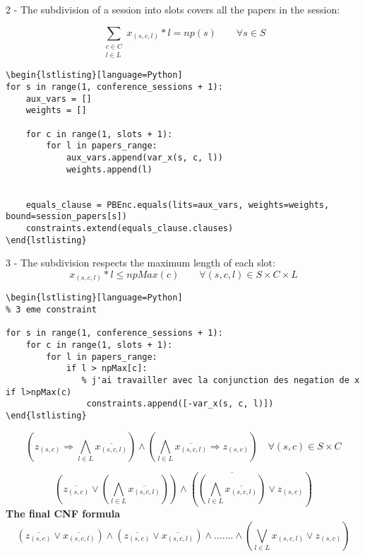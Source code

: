 \documentclass{article}
\begin{document}
2 - The subdivision of a session into slots covers all the papers in the session:

$$ \sum_{\substack{c\in C\\ l\in L}} x_{(s,c,l)}*l  = np(s)   \qquad \forall s\in S$$

\begin{verbatim}
\begin{lstlisting}[language=Python]
for s in range(1, conference_sessions + 1):
    aux_vars = []  
    weights = []   

    for c in range(1, slots + 1):
        for l in papers_range:
            aux_vars.append(var_x(s, c, l))
            weights.append(l)  

   
    equals_clause = PBEnc.equals(lits=aux_vars, weights=weights, bound=session_papers[s])
    constraints.extend(equals_clause.clauses)
\end{lstlisting}
\end{verbatim}

3 - The subdivision respects the maximum length of each slot:
$$ x_{(s,c,l)}*l \leq npMax(c)\qquad \forall (s,c,l)\in S\times C\times L $$

\begin{verbatim}
\begin{lstlisting}[language=Python]
% 3 eme constraint

for s in range(1, conference_sessions + 1):
    for c in range(1, slots + 1):
        for l in papers_range:
            if l > npMax[c]:
               % j'ai travailler avec la conjunction des negation de x if l>npMax(c)
                constraints.append([-var_x(s, c, l)])
\end{lstlisting}
\end{verbatim}

$$ \left( z_{(s,c)} \Longrightarrow \bigwedge_{l\in L} \overline{x_{(s,c,l)}} \right) \wedge \left( \bigwedge_{l\in L} \overline{x_{(s,c,l)}} \Longrightarrow z_{(s,c)} \right) \quad \forall (s,c)\in S\times C $$

$$\left(\overline{z_{(s,c)}} \vee \left(\bigwedge_{l\in L} \overline{x_{(s,c,l)}}\right) \right)\wedge \left( \overline{\left(\bigwedge_{l\in L} \overline{x_{(s,c,l)}}\right)} \vee z_{(s,c)} \right)  $$
\textbf{The final CNF formula}\\
$$\left(\overline{z_{(s,c)}} \vee \overline{x_{(s,c,l)}}\right)
 \wedge \left(\overline{z_{(s,c)}} \vee \overline{x_{(s,c,l)}}\right)\wedge ....... \wedge \left(\bigvee_{l\in L} x_{(s,c,l)} \vee z_{(s,c)}\right)$$
 
\end{document}

